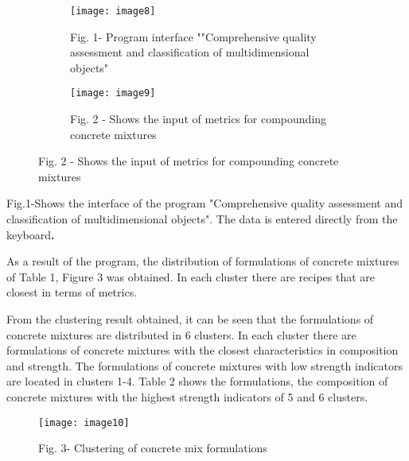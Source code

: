 \begin{figure}[H]
\centering
\begin{subfigure}[t]{0.45\textwidth}
  \centering
  \texttt{[image: image8]}
  \caption*{Fig. 1- Program interface ""Comprehensive quality assessment and
classification of multidimensional objects"}
\end{subfigure}
\hspace{0.05\textwidth}
\begin{subfigure}[t]{0.45\textwidth}
  \centering
  \texttt{[image: image9]}
  \caption*{Fig. 2 - Shows the input of metrics for compounding concrete mixtures}
\end{subfigure}
\end{figure}

\begin{multicols}{2}
Fig.1-Shows the interface of the program "Comprehensive quality
assessment and classification of multidimensional objects". The data is
entered directly from the keyboard{\bfseries .}

As a result of the program, the distribution of formulations of concrete
mixtures of Table 1, Figure 3 was obtained. In each cluster there are
recipes that are closest in terms of metrics.

From the clustering result obtained, it can be seen that the
formulations of concrete mixtures are distributed in 6 clusters. In each
cluster there are formulations of concrete mixtures with the closest
characteristics in composition and strength. The formulations of
concrete mixtures with low strength indicators are located in clusters
1-4. Table 2 shows the formulations, the composition of concrete
mixtures with the highest strength indicators of 5 and 6 clusters.
\end{multicols}

\begin{figure}
  \centering
  \texttt{[image: image10]}
  \caption*{Fig. 3- Clustering of concrete mix formulations}
\end{figure}


